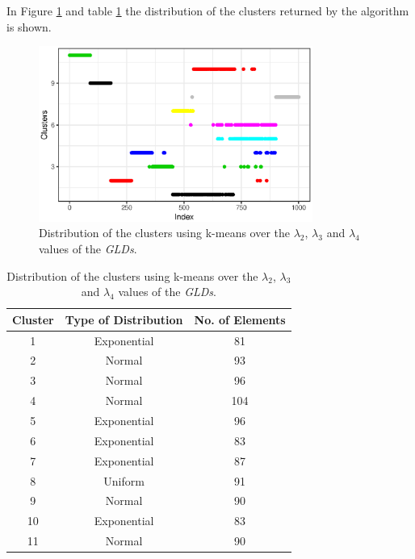 In Figure \ref{fig:dataset1_l2l3l4} and table \ref{tab:dataset1_l2l3l4} the distribution of the clusters returned by the algorithm is shown.

\begin{figure}[H]
    \centering
    \includegraphics[width=0.8\textwidth]{img/gld_clustering/datasetI/l2l3l4/normal_exponential_uniform3.eps}
    \caption{Distribution of the clusters using k-means over the $\lambda_{2}$, $\lambda_{3}$ and $\lambda_{4}$ values of the \textit{GLDs}.}
    \label{fig:dataset1_l2l3l4}
\end{figure}

\begin{table}[]
\centering
\caption{Distribution of the clusters using k-means over the $\lambda_{2}$, $\lambda_{3}$ and $\lambda_{4}$ values of the \textit{GLDs}.}
\label{tab:dataset1_l2l3l4}
\begin{tabular}{|c|c|c|}
\hline
Cluster & Type of Distribution & No. of Elements \\ \hline
1       & Exponential          & 81              \\ \hline
2       & Normal          & 93              \\ \hline
3       & Normal          & 96             \\ \hline
4       & Normal               & 104              \\ \hline
5       & Exponential               & 96              \\ \hline
6       & Exponential               & 83             \\ \hline
7       & Exponential              & 87             \\ \hline
8       & Uniform          & 91              \\ \hline
9       & Normal          & 90               \\ \hline
10      & Exponential               & 83              \\ \hline
11      & Normal          & 90              \\ \hline
\end{tabular}
\end{table}

